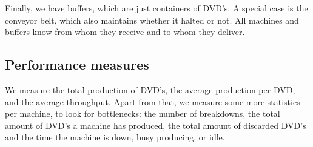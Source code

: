 \documentclass{article}
\begin{document}
Finally, we have buffers, which are just containers of DVD's.
A special case is the conveyor belt, which also maintains whether it halted or not.
All machines and buffers know from whom they receive and to whom they deliver.

\subsection{Performance measures}
\label{performance_measures}
We measure the total production of DVD's, the average production per DVD,
and the average throughput.
Apart from that, we measure some more statistics per machine, to look for bottlenecks:
the number of breakdowns, the total amount of DVD's a machine has produced,
the total amount of discarded DVD's and the time the machine is down, busy producing, or idle.
\end{document}
